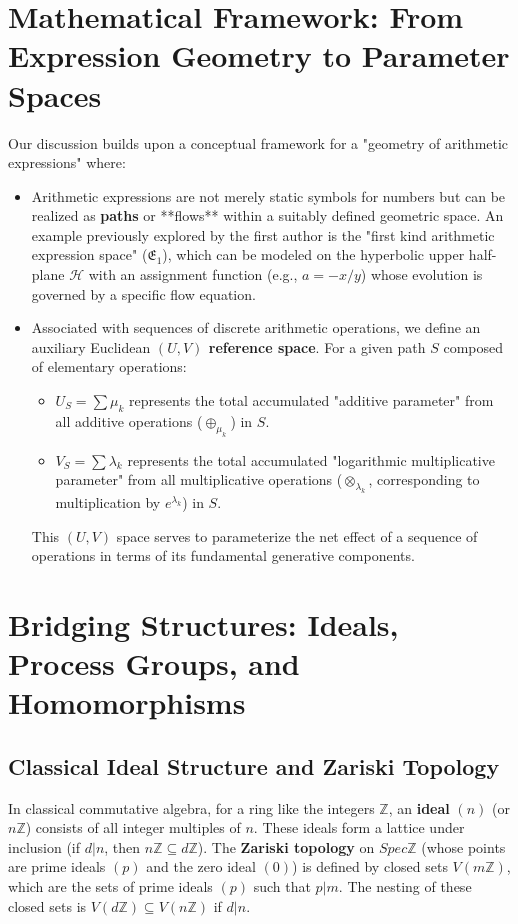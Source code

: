 \documentclass{article}[a4paper,12pt]
\begin{document}
\section{Mathematical Framework: From Expression Geometry to Parameter Spaces}
\label{sec:math_framework}

Our discussion builds upon a conceptual framework for a "geometry of arithmetic expressions" where:

\begin{itemize}
    \item Arithmetic expressions are not merely static symbols for numbers but can be realized as \textbf{paths} or **flows** within a suitably defined geometric space. An example previously explored by the first author is the "first kind arithmetic expression space" ($\mathfrak{E}_1$), which can be modeled on the hyperbolic upper half-plane $\mathcal{H}$ with an assignment function (e.g., $a = -x/y$) whose evolution is governed by a specific flow equation.
    \item Associated with sequences of discrete arithmetic operations, we define an auxiliary Euclidean \textbf{$(U,V)$ reference space}. For a given path $S$ composed of elementary operations:
    \begin{itemize}
        \item $U_S = \sum \mu_k$ represents the total accumulated "additive parameter" from all additive operations ($\oplus_{\mu_k}$) in $S$.
        \item $V_S = \sum \lambda_k$ represents the total accumulated "logarithmic multiplicative parameter" from all multiplicative operations ($\otimes_{\lambda_k}$, corresponding to multiplication by $e^{\lambda_k}$) in $S$.
    \end{itemize}
    This $(U,V)$ space serves to parameterize the net effect of a sequence of operations in terms of its fundamental generative components.
\end{itemize}

\section{Bridging Structures: Ideals, Process Groups, and Homomorphisms}
\label{sec:bridging}

\subsection{Classical Ideal Structure and Zariski Topology}
In classical commutative algebra, for a ring like the integers $\mathbb{Z}$, an \textbf{ideal} $(n)$ (or $n\mathbb{Z}$) consists of all integer multiples of $n$. These ideals form a lattice under inclusion (if $d|n$, then $n\mathbb{Z} \subseteq d\mathbb{Z}$). The \textbf{Zariski topology} on $Spec \mathbb{Z}$ (whose points are prime ideals $(p)$ and the zero ideal $(0)$) is defined by closed sets $V(m\mathbb{Z})$, which are the sets of prime ideals $(p)$ such that $p|m$. The nesting of these closed sets is $V(d\mathbb{Z}) \subseteq V(n\mathbb{Z})$ if $d|n$.
\end{document}
